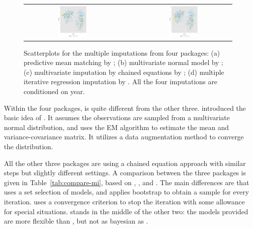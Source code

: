 \documentclass[article]{jss}
\begin{document}
\begin{center}
\begin{figure}[h]
\begin{centering}
\begin{tabular}{cccc}
\includegraphics[width=0.32\textwidth]{graph/fig3-8-mice-2} &  &  & \includegraphics[width=0.32\textwidth]{graph/fig3-9-mi-2}\tabularnewline
\end{tabular}
\par\end{centering}
\caption{Scatterplots for the multiple imputations from four  packages: (a) predictive mean matching by ; (b) multivariate normal model by ; (c) multivariate imputation by chained equations by ; (d) multiple iterative regression imputation by . All the four imputations are conditioned on year.}
\label{fig:multiple-imputation}
\end{figure}
\par\end{center}


Within the four packages,  is quite different from the other three. \citet{schafer1998multiple} introduced the basic idea of . It assumes the observations are sampled from a multivariate normal distribution, and uses the EM algorithm to estimate the mean and variance-covariance matrix. It utilizes a data augmentation method to converge the distribution. 

All the other three packages are using a chained equation approach with similar steps but slightly different settings. A comparison between the three packages is given in Table~\ref{tab:compare-mi}, based on \citet{hmisc}, \citet{mice}, and \citet{mi}. The main differences are that  uses a set selection of models, and applies bootstrap to obtain a sample for every iteration.  uses a convergence criterion to stop the iteration with some allowance for special situations.  stands in the middle of the other two: the models provided are more flexible than , but not as bayesian as .
\end{document}
